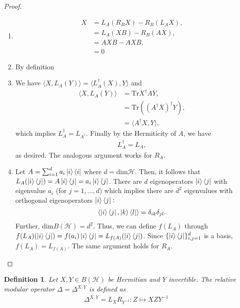 \documentclass[notoc]{tufte-book}
\newtheorem{definition}[theorem]{Definition}
\begin{document}
\begin{proof}
\begin{enumerate}
    \item \begin{align}
        [L_A,R_B]X&= L_A (R_B X) - R_B (L_A X), \\
        &= L_A( XB) - R_B( AX), \\
        &= AXB -AXB, \\
        &= 0
    \end{align}
    \item By definition
    \item We have $\langle X, L_A(Y) \rangle = \langle L_A^{\dagger}(X),Y\rangle$ and 
    \begin{align}
        \langle X,L_A(Y) \rangle &= \text{Tr} X^{\dagger}A Y, \\
        &= \text{Tr} ((A^{\dagger}X)^{\dagger}Y), \\
        &= \langle A^{\dagger}X,Y \rangle,
    \end{align}
    which implies $L^{\dagger}_A = L_{A^{\dagger}}$. Finally by the Hermiticity of $A$, we have
    \begin{align}
        L^{\dagger}_A = L_A,
    \end{align}
    as desired. The analogous argument works for $R_A$.
    \item Let $A=\sum_{i=1}^d a_i \ket{i}\bra{i}$ where $d=\text{dim}\mathcal{H}$. Then, it follows that $L_A (\ket{i}\bra{j}) = A \ket{i}\bra{j} = a_i \ket{i}\bra{j}$. There are $d$ eigenoperators $\ket{i}\bra{j}$ with eigenvalue $a_i$ (for $j=1,\dots,d$) which implies there are $d^2$ eigenvalues with orthogonal eigenoperators $\ket{i}\bra{j}:$
    \begin{align}
        \langle \ket{i}\bra{j}, \ket{k}\bra{l} \rangle = \delta_{ik} \delta_{jl}.
    \end{align}
    Further, dim$B(\mathcal{H})=d^2$. Thus, we can define $f(L_A)$ through $f(L_A)(\ket{i}\bra{j}) = f(a_i)\ket{i}\bra{j} = L_{f(A)} (\ket{i}\bra{j})$. Since $\{\ket{i}\bra{j}\}_{i,j=1}^d$ is a basis, $f(L_A)=L_{f(A)}$. The same argument holds for $R_A$.
\end{enumerate}
\end{proof}
\begin{tcolorbox}[colframe=white,breakable, colback=black!5, arc=0pt, outer arc=0pt]
\begin{definition} 
Let $X,Y \in B(\mathcal{H})$ be Hermitian and $Y$ invertible. The relative modular operator $\Delta = \Delta^{X,Y}$ is defined as
\begin{align}
    \Delta^{X,Y} = L_X R_{Y^{-1}} : Z \mapsto XZY^{-1}
\end{align}
\end{definition}
\end{tcolorbox}
\end{document}
